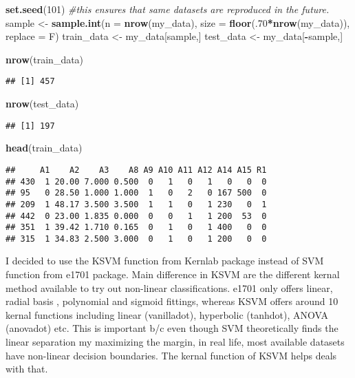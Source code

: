 \documentclass[
]{article}
\newenvironment{Shaded}{\begin{snugshade}}{\end{snugshade}}
\newcommand{\CommentTok}[1]{\textcolor[rgb]{0.56,0.35,0.01}{\textit{#1}}}
\newcommand{\DataTypeTok}[1]{\textcolor[rgb]{0.13,0.29,0.53}{#1}}
\newcommand{\DecValTok}[1]{\textcolor[rgb]{0.00,0.00,0.81}{#1}}
\newcommand{\KeywordTok}[1]{\textcolor[rgb]{0.13,0.29,0.53}{\textbf{#1}}}
\newcommand{\NormalTok}[1]{#1}
\newcommand{\OperatorTok}[1]{\textcolor[rgb]{0.81,0.36,0.00}{\textbf{#1}}}
\newcommand{\StringTok}[1]{\textcolor[rgb]{0.31,0.60,0.02}{#1}}
\begin{document}
\begin{Shaded}
\begin{Highlighting}[]
\KeywordTok{set.seed}\NormalTok{(}\DecValTok{101}\NormalTok{) }\CommentTok{#this ensures that same datasets are reproduced in the future.}
\NormalTok{sample <-}\StringTok{ }\KeywordTok{sample.int}\NormalTok{(}\DataTypeTok{n =} \KeywordTok{nrow}\NormalTok{(my_data), }\DataTypeTok{size =} \KeywordTok{floor}\NormalTok{(.}\DecValTok{70}\OperatorTok{*}\KeywordTok{nrow}\NormalTok{(my_data)), }\DataTypeTok{replace =}\NormalTok{ F)}
\NormalTok{train_data <-}\StringTok{ }\NormalTok{my_data[sample,]}
\NormalTok{test_data  <-}\StringTok{ }\NormalTok{my_data[}\OperatorTok{-}\NormalTok{sample,]}

\KeywordTok{nrow}\NormalTok{(train_data)}
\end{Highlighting}
\end{Shaded}

\begin{verbatim}
## [1] 457
\end{verbatim}

\begin{Shaded}
\begin{Highlighting}[]
\KeywordTok{nrow}\NormalTok{(test_data)}
\end{Highlighting}
\end{Shaded}

\begin{verbatim}
## [1] 197
\end{verbatim}

\begin{Shaded}
\begin{Highlighting}[]
\KeywordTok{head}\NormalTok{(train_data)}
\end{Highlighting}
\end{Shaded}

\begin{verbatim}
##     A1    A2    A3    A8 A9 A10 A11 A12 A14 A15 R1
## 430  1 20.00 7.000 0.500  0   1   0   1   0   0  0
## 95   0 28.50 1.000 1.000  1   0   2   0 167 500  0
## 209  1 48.17 3.500 3.500  1   1   0   1 230   0  1
## 442  0 23.00 1.835 0.000  0   0   1   1 200  53  0
## 351  1 39.42 1.710 0.165  0   1   0   1 400   0  0
## 315  1 34.83 2.500 3.000  0   1   0   1 200   0  0
\end{verbatim}

I decided to use the KSVM function from Kernlab package instead of SVM
function from e1701 package. Main difference in KSVM are the different
kernal method available to try out non-linear classifications. e1701
only offers linear, radial basis , polynomial and sigmoid fittings,
whereas KSVM offers around 10 kernal functions including linear
(vanilladot), hyperbolic (tanhdot), ANOVA (anovadot) etc. This is
important b/c even though SVM theoretically finds the linear separation
my maximizing the margin, in real life, most available datasets have
non-linear decision boundaries. The kernal function of KSVM helps deals
with that.
\end{document}
